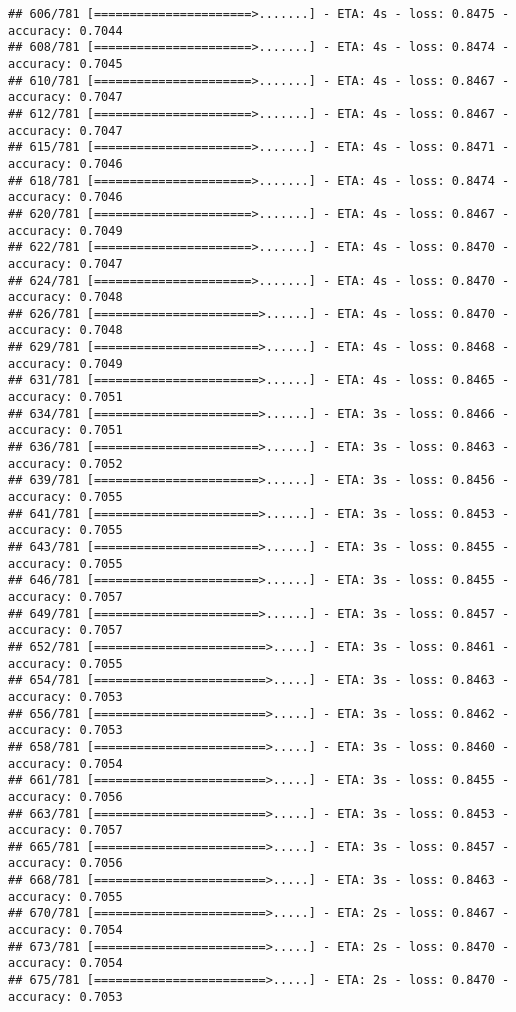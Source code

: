 \documentclass[
]{article}
\begin{document}
\begin{verbatim}
## 606/781 [======================>.......] - ETA: 4s - loss: 0.8475 - accuracy: 0.7044
## 608/781 [======================>.......] - ETA: 4s - loss: 0.8474 - accuracy: 0.7045
## 610/781 [======================>.......] - ETA: 4s - loss: 0.8467 - accuracy: 0.7047
## 612/781 [======================>.......] - ETA: 4s - loss: 0.8467 - accuracy: 0.7047
## 615/781 [======================>.......] - ETA: 4s - loss: 0.8471 - accuracy: 0.7046
## 618/781 [======================>.......] - ETA: 4s - loss: 0.8474 - accuracy: 0.7046
## 620/781 [======================>.......] - ETA: 4s - loss: 0.8467 - accuracy: 0.7049
## 622/781 [======================>.......] - ETA: 4s - loss: 0.8470 - accuracy: 0.7047
## 624/781 [======================>.......] - ETA: 4s - loss: 0.8470 - accuracy: 0.7048
## 626/781 [=======================>......] - ETA: 4s - loss: 0.8470 - accuracy: 0.7048
## 629/781 [=======================>......] - ETA: 4s - loss: 0.8468 - accuracy: 0.7049
## 631/781 [=======================>......] - ETA: 4s - loss: 0.8465 - accuracy: 0.7051
## 634/781 [=======================>......] - ETA: 3s - loss: 0.8466 - accuracy: 0.7051
## 636/781 [=======================>......] - ETA: 3s - loss: 0.8463 - accuracy: 0.7052
## 639/781 [=======================>......] - ETA: 3s - loss: 0.8456 - accuracy: 0.7055
## 641/781 [=======================>......] - ETA: 3s - loss: 0.8453 - accuracy: 0.7055
## 643/781 [=======================>......] - ETA: 3s - loss: 0.8455 - accuracy: 0.7055
## 646/781 [=======================>......] - ETA: 3s - loss: 0.8455 - accuracy: 0.7057
## 649/781 [=======================>......] - ETA: 3s - loss: 0.8457 - accuracy: 0.7057
## 652/781 [========================>.....] - ETA: 3s - loss: 0.8461 - accuracy: 0.7055
## 654/781 [========================>.....] - ETA: 3s - loss: 0.8463 - accuracy: 0.7053
## 656/781 [========================>.....] - ETA: 3s - loss: 0.8462 - accuracy: 0.7053
## 658/781 [========================>.....] - ETA: 3s - loss: 0.8460 - accuracy: 0.7054
## 661/781 [========================>.....] - ETA: 3s - loss: 0.8455 - accuracy: 0.7056
## 663/781 [========================>.....] - ETA: 3s - loss: 0.8453 - accuracy: 0.7057
## 665/781 [========================>.....] - ETA: 3s - loss: 0.8457 - accuracy: 0.7056
## 668/781 [========================>.....] - ETA: 3s - loss: 0.8463 - accuracy: 0.7055
## 670/781 [========================>.....] - ETA: 2s - loss: 0.8467 - accuracy: 0.7054
## 673/781 [========================>.....] - ETA: 2s - loss: 0.8470 - accuracy: 0.7054
## 675/781 [========================>.....] - ETA: 2s - loss: 0.8470 - accuracy: 0.7053

\end{verbatim}
\end{document}
